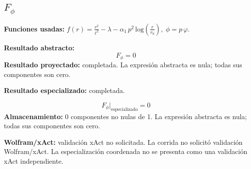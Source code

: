 \documentclass[11pt]{article}
\begin{document}
\subsection*{$ F_{\phi} $}
\textbf{Funciones usadas:} $ f\!\left(r\right) = \frac{{r}^{2}}{{\ell}^{2}} - \lambda - \alpha_{1}\,{p}^{2}\,\mathrm{log}\!\left(\frac{r}{r_{0}}\right),\;\phi=p\,\varphi $.\par
\textbf{Resultado abstracto:}
\begin{dmath*}[breakdepth={5}]
F_{\phi} = 0
\end{dmath*}
\textbf{Resultado proyectado:} completada. La expresión abstracta es nula; todas sus componentes son cero.\par
\textbf{Resultado especializado:} completada.\par
\begin{dmath*}[breakdepth={5}]
F_{\phi}\big|_{\mathrm{especializado}} = 0
\end{dmath*}
\textbf{Almacenamiento:} 0 componentes no nulas de 1. La expresión abstracta es nula; todas sus componentes son cero.\par
\textbf{Wolfram/xAct:} validación xAct no solicitada. La corrida no solicitó validación Wolfram/xAct. La especialización coordenada no se presenta como una validación xAct independiente.\par\medskip
{}
\end{document}
